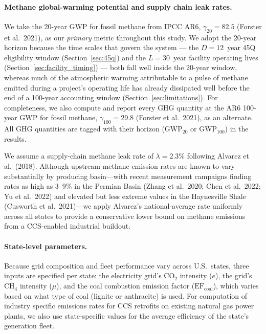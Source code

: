 \documentclass[11pt]{article}
\newcommand{\cotwo}{\ensuremath{\mathrm{CO_2}}}
\newcommand{\chfour}{\ensuremath{\mathrm{CH_4}}}
\begin{document}
\paragraph{Methane global-warming potential and supply chain leak rates.}
We take the 20-year GWP for fossil methane from IPCC AR6, $\gamma_{20} = 82.5$ (Forster et al.\ 2021), as our \emph{primary} metric throughout this study. We adopt the 20-year horizon because the time scales that govern the system --- the $D = 12$~year 45Q eligibility window (Section~\ref{sec:45q}) and the $L = 30$~year facility operating lives (Section~\ref{sec:facility_timing}) --- both fall well inside the 20-year window, whereas much of the atmospheric warming attributable to a pulse of methane emitted during a project's operating life has already dissipated well before the end of a 100-year accounting window (Section~\ref{sec:limitations}). For completeness, we also compute and report every GHG quantity at the AR6 100-year GWP for fossil methane, $\gamma_{100} = 29.8$ (Forster et al.\ 2021), as an alternate. All GHG quantities are tagged with their horizon (GWP$_{20}$ or GWP$_{100}$) in the results.

We assume a supply-chain methane leak rate of $\lambda = 2.3\%$ following Alvarez et al.\ (2018). Although upstream methane emission rates are known to vary substantially by producing basin---with recent measurement campaigns finding rates as high as 3--9\% in the Permian Basin (Zhang et al.\ 2020; Chen et al.\ 2022; Yu et al.\ 2022) and elevated but less extreme values in the Haynesville Shale (Cusworth et al.\ 2021)---we  apply Alvarez's national-average rate uniformly across all states to provide a conservative lower bound on methane emissions from a CCS-enabled industrial buildout.

\paragraph{State-level parameters.}
Because grid composition and fleet performance vary across U.S.\ states, three inputs are specified per state: the electricity grid's \cotwo{} intensity ($e$), the grid's \chfour{} intensity ($\mu$), and the coal combustion emission factor ($\mathrm{EF}_{\text{coal}}$), which varies based on what type of coal (lignite or anthracite) is used. For computation of industry specific emissions rates for CCS retrofits on existing natural gas power plants, we also use state-specific values for the average efficiency of the state's generation fleet.
\end{document}
